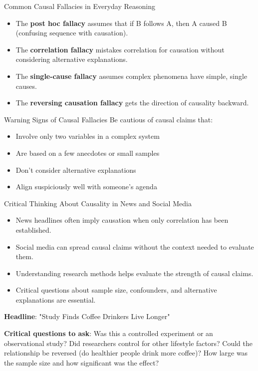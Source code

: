 \documentclass{beamer}
\begin{document}
\begin{frame}{Common Causal Fallacies in Everyday Reasoning}
    \begin{itemize}
        \item The \textbf{post hoc fallacy} assumes that if B follows A, then A caused B (confusing sequence with causation).
        \item The \textbf{correlation fallacy} mistakes correlation for causation without considering alternative explanations.
        \item The \textbf{single-cause fallacy} assumes complex phenomena have simple, single causes.
        \item The \textbf{reversing causation fallacy} gets the direction of causality backward.
    \end{itemize}
    
    \begin{alertblock}{Warning Signs of Causal Fallacies}
        Be cautious of causal claims that:
        \begin{itemize}
            \item Involve only two variables in a complex system
            \item Are based on a few anecdotes or small samples
            \item Don't consider alternative explanations
            \item Align suspiciously well with someone's agenda
        \end{itemize}
    \end{alertblock}
\end{frame}

\begin{frame}{Critical Thinking About Causality in News and Social Media}
    \begin{itemize}
        \item News headlines often imply causation when only correlation has been established.
        \item Social media can spread causal claims without the context needed to evaluate them.
        \item Understanding research methods helps evaluate the strength of causal claims.
        \item Critical questions about sample size, confounders, and alternative explanations are essential.
    \end{itemize}
    
    \begin{example}
        \textbf{Headline}: "Study Finds Coffee Drinkers Live Longer"
        
        \textbf{Critical questions to ask}:
        Was this a controlled experiment or an observational study?
        Did researchers control for other lifestyle factors?
        Could the relationship be reversed (do healthier people drink more coffee)?
        How large was the sample size and how significant was the effect?
    \end{example}
\end{frame}
\end{document}
